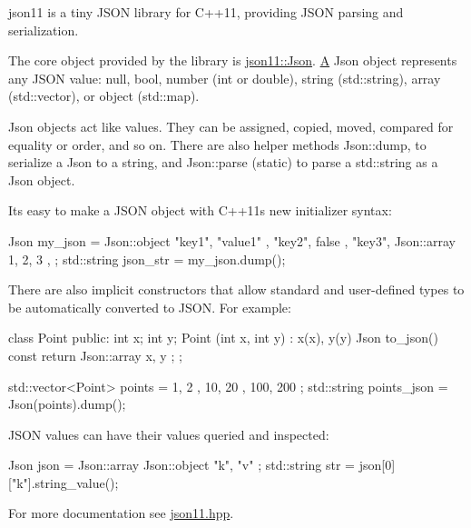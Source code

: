 json11 is a tiny JSON library for C++11, providing JSON parsing and serialization.

The core object provided by the library is \mbox{\hyperlink{classjson11_1_1_json}{json11\+::\+Json}}. \mbox{\hyperlink{class_a}{A}} Json object represents any JSON value\+: null, bool, number (int or double), string (std\+::string), array (std\+::vector), or object (std\+::map).

Json objects act like values. They can be assigned, copied, moved, compared for equality or order, and so on. There are also helper methods Json\+::dump, to serialize a Json to a string, and Json\+::parse (static) to parse a std\+::string as a Json object.

It\textquotesingle{}s easy to make a JSON object with C++11\textquotesingle{}s new initializer syntax\+: \begin{DoxyVerb}Json my_json = Json::object {
    { "key1", "value1" },
    { "key2", false },
    { "key3", Json::array { 1, 2, 3 } },
};
std::string json_str = my_json.dump();
\end{DoxyVerb}
 There are also implicit constructors that allow standard and user-\/defined types to be automatically converted to JSON. For example\+: \begin{DoxyVerb}class Point {
public:
    int x;
    int y;
    Point (int x, int y) : x(x), y(y) {}
    Json to_json() const { return Json::array { x, y }; }
};

std::vector<Point> points = { { 1, 2 }, { 10, 20 }, { 100, 200 } };
std::string points_json = Json(points).dump();
\end{DoxyVerb}
 JSON values can have their values queried and inspected\+: \begin{DoxyVerb}Json json = Json::array { Json::object { { "k", "v" } } };
std::string str = json[0]["k"].string_value();
\end{DoxyVerb}
 For more documentation see \mbox{\hyperlink{json11_8hpp_source}{json11.\+hpp}}. 